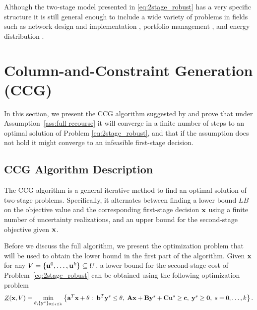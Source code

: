 \documentclass[12pt,x11names]{article}
\theoremstyle{definition}
\newcommand{\paren}[1]{\left\{ {#1} \right\}} %
\newcommand{\bzero}{{\bf 0}}
\newcommand{\ba}{{\bf a}}
\newcommand{\bb}{{\bf b}}
\newcommand{\bc}{{\bf c}}
\newcommand{\bu}{{\bf u}}
\newcommand{\bx}{{\bf x}}
\newcommand{\by}{{\bf y}}
\newcommand{\bba}{{\bf A}}
\newcommand{\bbb}{{\bf B}}
\newcommand{\bbc}{{\bf C}}
\DeclareMathOperator*{\argmin}{arg\,min}
\begin{document}
Although the two-stage model presented in \ref{eq:2stage_robust} has a very specific structure it is still general enough to include a wide variety of problems in fields such as network design and implementation \citep{AtamturkZhang2007,Gabrel2014}, portfolio management \citep{Takeda2007}, and energy distribution \citep{Bertsimas2013,Zhao2013}. 
\fi

\section{Column-and-Constraint Generation (CCG)}\label{sec:CCG}
In this section, we present the CCG algorithm suggested by \citet{Zeng2013} and prove that under Assumption~\ref{ass:full recourse} it will converge in a finite number of steps to an optimal solution of Problem \eqref{eq:2stage_robust}, and that if the assumption does not hold it might converge to an infeasible first-stage decision.
\subsection{CCG Algorithm Description}
The CCG algorithm is a general iterative method to find an optimal solution of two-stage problems. Specifically, it alternates between finding a lower bound $LB$ on the objective value and the corresponding first-stage decision $\bx$ using a finite number of uncertainty realizations, and an upper bound for the second-stage objective given $\bx$. 

Before we discuss the full algorithm, we present the optimization problem that will be used to obtain the lower bound in the first part of the algorithm.
Given $\bx$ for any $V=\{\bu^0,\ldots,\bu^{k}\}\subseteq U$, a lower bound for the second-stage cost of  Problem~\eqref{eq:2stage_robust} can be obtained using the following optimization problem
\begin{equation}\label{Prob:LowerBound_SecondStage}\underline{Z}(\bx,V)=\min_{\theta,\{\by^s\}_{0\leq s\leq k}} \paren{\ba^T\bx+\theta:\;\bb^T\by^s\leq \theta,\;\bba\bx+\bbb\by^s+\bbc\bu^s\geq \bc,\;\by^s\geq \bzero,\; s=0,\ldots,k}.\end{equation}
\end{document}
